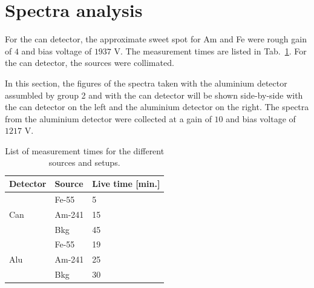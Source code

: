 \section{Spectra analysis}
\label{sec:spectraanalysis}
For the can detector, the approximate sweet spot for Am and Fe were rough gain of $4$ and bias voltage of $1937$ V. The measurement times are listed in Tab.~\ref{tab:measurementstimes}. For the can detector, the sources were collimated.

In this section, the figures of the spectra taken with the aluminium detector assumbled by group 2 and with the can detector will be shown side-by-side with the can detector on the left and the aluminium detector on the right. The spectra from the aluminium detector were collected at a gain of $10$ and bias voltage of $1217$ V.

\begin{table}[htb]
  \centering
\begin{tabular}{lll}
\textbf{Detector}    & \textbf{Source} & \textbf{Live time {[}min.{]}} \\ \hline
\multirow{3}{*}{Can} & Fe-55           & 5                          \\
                     & Am-241          & 15                         \\
                     & Bkg             & 45                         \\ \hline
\multirow{3}{*}{Alu} & Fe-55           & 19                         \\
                     & Am-241          & 25                         \\
                     & Bkg             & 30                         \\ \hline
\end{tabular}
\caption{List of measurement times for the different sources and setups.}
\label{tab:measurementstimes}
\end{table}


